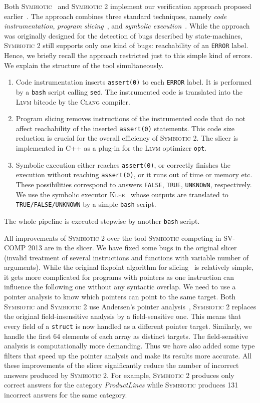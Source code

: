 \documentclass[10pt]{llncs}
\newcommand\tool{\textsc{Symbiotic}\xspace}
\newcommand\klee{\textsc{Klee}\xspace}
\begin{document}
Both \tool~\cite{SST13} and \tool 2 implement our verification approach
proposed earlier~\cite{sse}. The approach combines three standard techniques,
namely \emph{code instrumentation}, \emph{program slicing}~\cite{weiser}, and
\emph{symbolic execution}~\cite{king}. While the approach was originally
designed for the detection of bugs described by state-machines, \tool 2 still
supports only one kind of bugs: reachability of an \texttt{ERROR} label.
Hence, we briefly recall the approach restricted just to this simple kind of
errors. We explain the structure of the tool simultaneously.
\begin{enumerate}
\item Code instrumentation inserts \texttt{assert(0)} to each \texttt{ERROR}
  label. It is performed by a \texttt{bash} script calling \texttt{sed}. The
  instrumented code is translated into the \textsc{Llvm} bitcode by
  the \textsc{Clang} compiler.
\item Program slicing removes instructions of the instrumented code that do
  not affect reachability of the inserted \texttt{assert(0)}
  statements. This code size reduction is crucial for the overall efficiency
  of \tool 2. The slicer is implemented in C++ as a plug-in for the
  \textsc{Llvm} optimizer \texttt{opt}.
\item Symbolic execution either reaches \texttt{assert(0)}, or correctly
  finishes the execution without reaching \texttt{assert(0)}, or it runs out
  of time or memory etc. These possibilities correspond to answers
  \texttt{FALSE}, \texttt{TRUE}, \texttt{UNKNOWN}, respectively.
  We use the symbolic executor \klee~\cite{klee} whose outputs are translated
  to \texttt{TRUE/FALSE/UNKNOWN} by a simple \texttt{bash} script.
\end{enumerate}
The whole pipeline is executed stepwise by another \texttt{bash} script.

All improvements of \tool 2 over the tool \tool competing in SV-COMP 2013
are in the slicer.  We have fixed some bugs in the original slicer (invalid
treatment of several instructions and functions with variable number of
arguments). While the original fixpoint algorithm for slicing~\cite{weiser}
is relatively simple, it gets more complicated for programs with pointers as
one instruction can influence the following one without any syntactic
overlap. We need to use a pointer analysis to know which pointers can point
to the same target. Both \tool and \tool 2 use Andersen's pointer
analysis~\cite{And94}, \tool 2 replaces the original field-insensitive
analysis by a field-sensitive one. This means that every field of a
\texttt{struct} is now handled as a different pointer target. Similarly, we
handle the first 64 elements of each array as distinct targets. The
field-sensitive analysis is computationally more demanding. Thus we have
also added some type filters that speed up the pointer analysis and make its
results more accurate. All these improvements of the slicer significantly
reduce the number of incorrect answers produced by \tool 2. For example,
\tool 2 produces only correct answers for the category \emph{ProductLines}
while \tool produces 131 incorrect answers for the same category.
 
\end{document}

